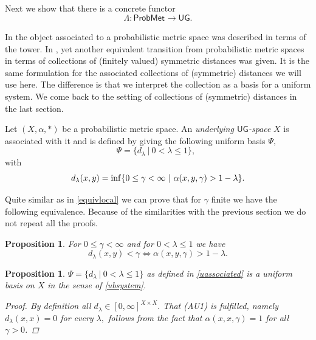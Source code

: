 \documentclass[12pt,a4paper]{amsart}
\theoremstyle{theorem}
\newtheorem{proposition}[theorem]{Proposition}
\theoremstyle{definition}
\newcommand{\PM}{\ensuremath{\mathsf{ProbMet_{}}}}
\newcommand{\ug}{\ensuremath{\mathsf{UG}}}
\renewcommand{\inf}{\myinf}
\DeclareMathOperator*{\myinf}{in\vphantom{p}f}
\renewcommand{\a}{\ensuremath{\alpha}}
\renewcommand{\l}{\ensuremath{\lambda}}
\def\rw{\rightarrow}
\begin{document}
{ 
 
Next we show that there is a concrete functor
$$
\Lambda : \PM \rw \ug.
$$

In \cite{CL} the object associated to a probabilistic metric space was described in terms of the tower.
In \cite{N} \cite{SS}, yet another equivalent transition from probabilistic metric spaces in terms of collections of (finitely valued) symmetric distances was given.
It is the same formulation for the associated collections of (symmetric) distances we will use here. The difference is that we interpret the collection as a basis for a uniform system. We come back to the setting of collections of (symmetric) distances in the last section.




Let $(X,\a,*)$ be a probabilistic metric space. An \emph{underlying $\ug$-space} $X$ is associated with it and is defined by giving the following uniform basis $\Psi,$
\begin{equation}\label{uassociated}
\Psi = \{ d_\l \ | \ 0 < \l \leq 1 \}, \ \ 
\end{equation}
with 
$$  d_\l(x,y) = \inf \{ 0 \leq \gamma < \infty \ | \ \a(x,y,\gamma) > 1 - \l \}.$$

Quite similar as in \eqref{equivlocal} we can prove that for $\gamma$ finite we have the following equivalence. Because of the similarities with the previous section we do not repeat all the proofs.


\begin{proposition}
For $0 \leq \gamma < \infty$ and for $0 < \l \leq 1$ we have
\begin{equation}\label{equivug}
d_\l (x,y) < \gamma \Leftrightarrow \a(x,y,\gamma) > 1-\l.
\end{equation}
\end{proposition}

\begin{proposition}\label{ug2}
$\Psi = \{ d_\l \ | \ 0 < \l \leq 1 \} $ as defined in \eqref{uassociated} is a uniform basis on $X$ in the sense of \ref{ubsystem}.
\begin{proof}
By definition all $d_\l \in [0,\infty]^{X \times X}.$
That (AU1) is fulfilled, namely $d_\l (x,x) = 0$ for every $\l,$ follows from the fact that $\a(x,x,\gamma) = 1$ for all $\gamma>0$.


\end{proof}
\end{proposition}}
\end{document}
